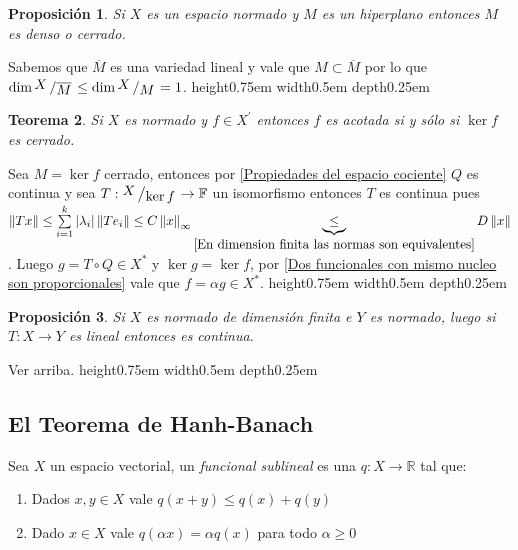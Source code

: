 \documentclass[11pt]{article}
\newcommand{\R}{{\mathbb{R}}}
\newcommand{\norm}[1]{\left\lVert#1\right\rVert}
\newcommand{\abs}[1]{\left\lvert#1\right\rvert}
\newcommand{\quotient}[2]{{\raisebox{.2em}{$#1$}\left/\raisebox{-.2em}{$#2$}\right.}}
\newtheorem{theorem}{Teorema}
\numberwithin{theorem}{subsection}
\newtheorem{proposition}[theorem]{Proposici\'on}
\newenvironment{proof}[1][Demostraci\'on]{\begin{trivlist}
		\item[\hskip \labelsep {\bfseries #1}]}{\end{trivlist}}
\newenvironment{definition}[1][Definici\'on]{\begin{trivlist}
		\item[\hskip \labelsep {\bfseries #1}]}{\end{trivlist}}
\newcommand{\qed}{\nobreak \ifvmode \relax \else
	\ifdim\lastskip<1.5em \hskip-\lastskip
	\hskip1.5em plus0em minus0.5em \fi \nobreak
	\vrule height0.75em width0.5em depth0.25em\fi}
\begin{document}
\begin{proposition}
	Si $X$ es un espacio normado y $M$ es un hiperplano entonces $M$ es denso o cerrado.
\end{proposition}

\begin{proof}
	Sabemos que $\overline{M}$ es una variedad lineal y vale que $M \subset \overline{M}$ por lo que $\dim \quotient{X}{\overline{M}} \leq \dim \quotient{X}{M} = 1$. \qed
\end{proof}

\begin{theorem}
	Si $X$ es normado y $f \in X^{'}$ entonces $f$ es acotada si y s\'olo si $\ker f$ es cerrado.
\end{theorem}

\begin{proof}
	Sea $M = \ker f$ cerrado, entonces por \ref{Propiedades del espacio cociente} $Q$ es continua y sea $T : \quotient{X}{\ker f} \rightarrow \mathbb{F}$ un isomorfismo entonces $T$ es continua pues $\norm{Tx} \leq \sum\limits_{i=1}^{k}{\abs{\lambda_i}\norm{Te_i}} \leq C\norm{x}_{\infty} \underbrace{\leq}_{\ref{En dimension finita las normas son equivalentes}} D \norm{x}$. Luego $g = T \circ Q \in X^{\ast}$ y $\ker g = \ker f$, por \ref{Dos funcionales con mismo nucleo son proporcionales} vale que $f = \alpha g \in X^{\ast}$. \qed
\end{proof}

\begin{proposition}
	\label{Operador desde un espacio de dim finita es continuo}
	Si $X$ es normado de dimensi\'on finita e $Y$ es normado, luego si $T: X \rightarrow Y$ es lineal entonces es continua.
\end{proposition}

\begin{proof}
	Ver arriba. \qed
\end{proof}

\subsection{El Teorema de Hanh-Banach}

\begin{definition}
	Sea $X$ un espacio vectorial, un \textit{funcional sublineal} es una $q : X \rightarrow \R$ tal que:
	
	\begin{enumerate}
		
		\item Dados $x,y \in X$ vale $q(x+y) \leq q(x) + q(y)$
		\item Dado $x \in X$ vale $q(\alpha x) = \alpha q(x)$ para todo $\alpha \geq 0$	
	\end{enumerate}
	
\end{definition}
\end{document}
